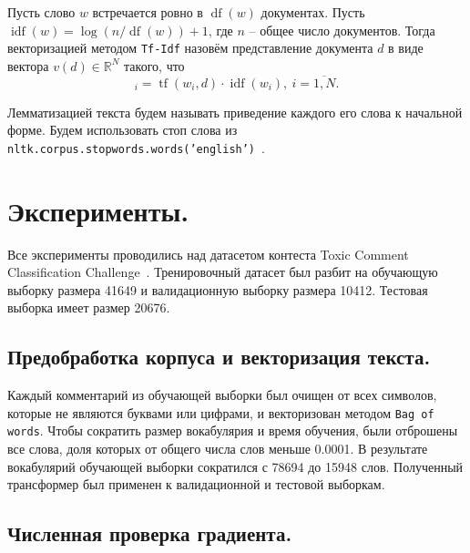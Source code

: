\documentclass[12pt]{extarticle}
\newcommand{\R}{\mathbb{R}}
\DeclareMathOperator{\tf}{\text{tf}}
\DeclareMathOperator{\idf}{\text{idf}}
\DeclareMathOperator{\df}{\text{df}}
\begin{document}
Пусть слово $w$ встречается ровно в $\df(w)$ документах. Пусть $\idf(w)=\log(n/\df(w))+1$, где $n$ -- общее число документов. Тогда векторизацией методом \texttt{Tf-Idf} назовём представление документа $d$ в виде вектора $v(d)\in\R^N$ такого, что
\begin{equation*}
    [v(d)]_i=\tf(w_i,d)\cdot\idf(w_i),\ i=\overline{1,N}.
\end{equation*}

Лемматизацией текста будем называть приведение каждого его слова к начальной форме. Будем использовать стоп слова из {\texttt{nltk.corpus.stopwords.words('english')}~\cite{nltkstop}}.

\section{Эксперименты.}

Все эксперименты проводились над датасетом контеста Toxic Comment Classification Challenge~\cite{kaggle}. Тренировочный датасет был разбит на обучающую выборку размера 41649 и валидационную выборку размера 10412. Тестовая выборка имеет размер 20676.

\subsection{Предобработка корпуса и векторизация текста.}

Каждый комментарий из обучающей выборки был очищен от всех символов, которые не являются буквами или цифрами, и векторизован методом \texttt{Bag of words}. Чтобы сократить размер вокабулярия и время обучения, были отброшены все слова, доля которых от общего числа слов меньше 0.0001. В результате вокабулярий обучающей выборки сократился с 78694 до 15948 слов. Полученный трансформер был применен к валидационной и тестовой выборкам.

\subsection{Численная проверка градиента.}
\end{document}

